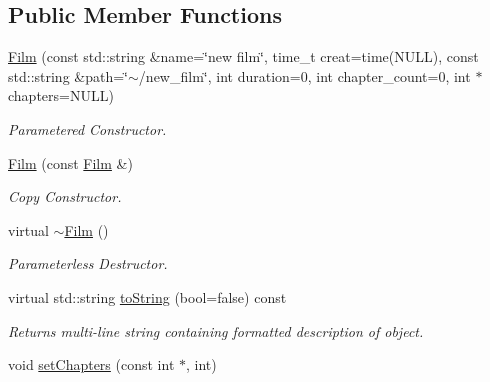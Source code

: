 \subsection*{Public Member Functions}
\begin{DoxyCompactItemize}
\item 
\hypertarget{classFilm_a704092a2bb7629c5bf053c8011e148ee}{\hyperlink{classFilm_a704092a2bb7629c5bf053c8011e148ee}{Film} (const std\+::string \&name=\char`\"{}new film\char`\"{}, time\+\_\+t creat=time(N\+U\+L\+L), const std\+::string \&path=\char`\"{}$\sim$/new\+\_\+film\char`\"{}, int duration=0, int chapter\+\_\+count=0, int $\ast$chapters=N\+U\+L\+L)}\label{classFilm_a704092a2bb7629c5bf053c8011e148ee}

\begin{DoxyCompactList}\small\item\em Parametered Constructor. \end{DoxyCompactList}\item 
\hypertarget{classFilm_a34c9de2efb9554ce1192e4110d98806b}{\hyperlink{classFilm_a34c9de2efb9554ce1192e4110d98806b}{Film} (const \hyperlink{classFilm}{Film} \&)}\label{classFilm_a34c9de2efb9554ce1192e4110d98806b}

\begin{DoxyCompactList}\small\item\em Copy Constructor. \end{DoxyCompactList}\item 
virtual \hyperlink{classFilm_a8dab653f8a6c0635ca5ddbe0bbdd9a25}{$\sim$\+Film} ()
\begin{DoxyCompactList}\small\item\em Parameterless Destructor. \end{DoxyCompactList}\item 
\hypertarget{classFilm_a413b52608cd8103e74d3ee7ea8026e17}{virtual std\+::string \hyperlink{classFilm_a413b52608cd8103e74d3ee7ea8026e17}{to\+String} (bool=false) const }\label{classFilm_a413b52608cd8103e74d3ee7ea8026e17}

\begin{DoxyCompactList}\small\item\em Returns multi-\/line string containing formatted description of object. \end{DoxyCompactList}\item 
\hypertarget{classFilm_ab0c2831b76a6b932dfc4a6facc38870c}{void \hyperlink{classFilm_ab0c2831b76a6b932dfc4a6facc38870c}{set\+Chapters} (const int $\ast$, int)}\label{classFilm_ab0c2831b76a6b932dfc4a6facc38870c}


\end{DoxyCompactItemize}

